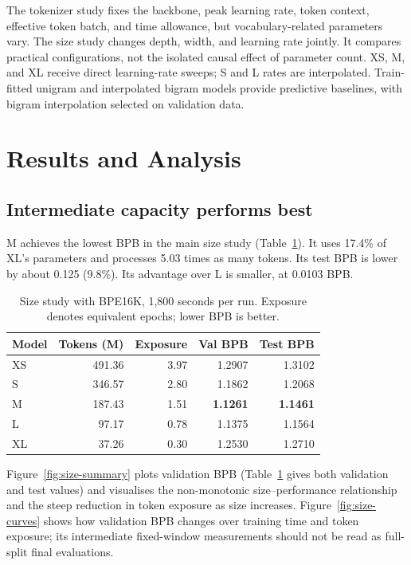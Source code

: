 \documentclass[11pt]{article}
\begin{document}
The tokenizer study fixes the backbone, peak learning rate, token context, effective token batch, and time allowance, but vocabulary-related parameters vary. The size study changes depth, width, and learning rate jointly. It compares practical configurations, not the isolated causal effect of parameter count. XS, M, and XL receive direct learning-rate sweeps; S and L rates are interpolated. Train-fitted unigram and interpolated bigram models provide predictive baselines, with bigram interpolation selected on validation data.

\section{Results and Analysis}
\subsection{Intermediate capacity performs best}
M achieves the lowest BPB in the main size study (Table~\ref{tab:size}). It uses 17.4\% of XL's parameters and processes 5.03 times as many tokens. Its test BPB is lower by about 0.125 (9.8\%). Its advantage over L is smaller, at 0.0103 BPB.

\begin{table}[htbp]
\centering\small
\caption{Size study with BPE16K, 1,800 seconds per run. Exposure denotes equivalent epochs; lower BPB is better.}
\label{tab:size}
\begin{tabular}{lrrrr}
\toprule
Model & Tokens (M) & Exposure & Val BPB & Test BPB\\
\midrule
XS & 491.36 & 3.97 & 1.2907 & 1.3102\\
S & 346.57 & 2.80 & 1.1862 & 1.2068\\
M & 187.43 & 1.51 & \textbf{1.1261} & \textbf{1.1461}\\
L & 97.17 & 0.78 & 1.1375 & 1.1564\\
XL & 37.26 & 0.30 & 1.2530 & 1.2710\\
\bottomrule
\end{tabular}
\end{table}

Figure~\ref{fig:size-summary} plots validation BPB (Table~\ref{tab:size} gives both validation and test values) and visualises the non-monotonic size--performance relationship and the steep reduction in token exposure as size increases. Figure~\ref{fig:size-curves} shows how validation BPB changes over training time and token exposure; its intermediate fixed-window measurements should not be read as full-split final evaluations.
\end{document}
